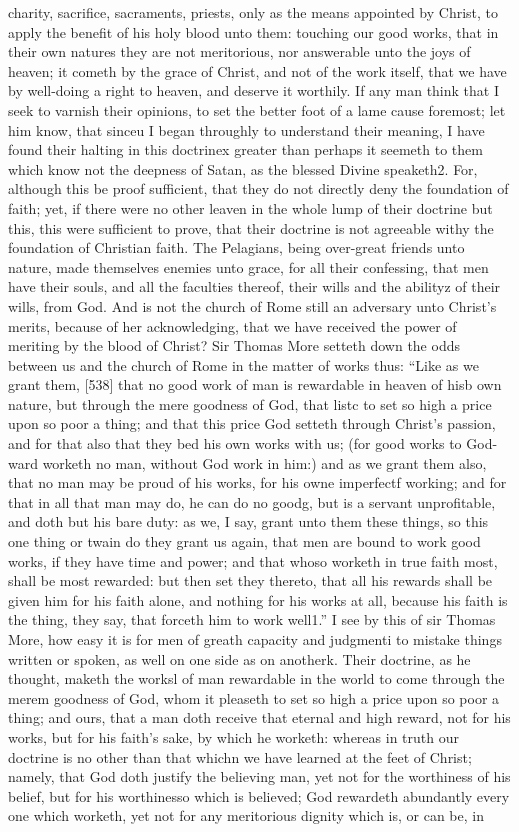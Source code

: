 charity, sacrifice, sacraments, priests, only as the means appointed by Christ, to apply the benefit of his holy blood unto them: touching our good works, that in their own natures they are not meritorious, nor answerable unto the joys of heaven; it cometh by the grace of Christ, and not of the work itself, that we have by well-doing a right to heaven, and deserve it worthily. If any man think that I seek to varnish their opinions, to set the better foot of a lame cause foremost; let him know, that sinceu I began throughly to understand their meaning, I have found their halting in this doctrinex greater than perhaps it seemeth to them which know not the deepness of Satan, as the blessed Divine speaketh2. For, although this be proof sufficient, that they do not directly deny the foundation of faith; yet, if there were no other leaven in the whole lump of their doctrine but this, this were sufficient to prove, that their doctrine is not agreeable withy the foundation of Christian faith. The Pelagians, being over-great friends unto nature, made themselves enemies unto grace, for all their confessing, that men have their souls, and all the faculties thereof, their wills and the abilityz of their wills, from God. And is not the church of Rome still an adversary unto Christ’s merits, because of her acknowledging, that we have received the power of meriting by the blood of Christ? Sir Thomas More setteth down the odds between us and the church of Rome in the matter of works thus: “Like as we grant them, [538] that no good work of man is rewardable in heaven of hisb own nature, but through the mere goodness of God, that listc to set so high a price upon so poor a thing; and that this price God setteth through Christ’s passion, and for that also that they bed his own works with us; (for good works to God-ward worketh no man, without God work in him:) and as we grant them also, that no man may be proud of his works, for his owne imperfectf working; and for that in all that man may do, he can do no goodg, but is a servant unprofitable, and doth but his bare duty: as we, I say, grant unto them these things, so this one thing or twain do they grant us again, that men are bound to work good works, if they have time and power; and that whoso worketh in true faith most, shall be most rewarded: but then set they thereto, that all his rewards shall be given him for his faith alone, and nothing for his works at all, because his faith is the thing, they say, that forceth him to work well1.” I see by this of sir Thomas More, how easy it is for men of greath capacity and judgmenti to mistake things written or spoken, as well on one side as on anotherk. Their doctrine, as he thought, maketh the worksl of man rewardable in the world to come through the merem goodness of God, whom it pleaseth to set so high a price upon so poor a thing; and ours, that a man doth receive that eternal and high reward, not for his works, but for his faith’s sake, by which he worketh: whereas in truth our doctrine is no other than that whichn we have learned at the feet of Christ; namely, that God doth justify the believing man, yet not for the worthiness of his belief, but for his worthinesso which is believed; God rewardeth abundantly every one which worketh, yet not for any meritorious dignity which is, or can be, in 